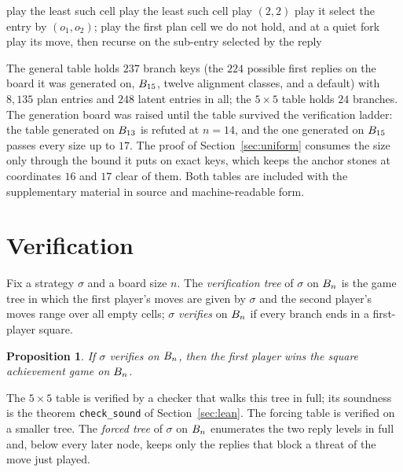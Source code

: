 \documentclass[11pt]{amsart}
\newtheorem{proposition}[theorem]{Proposition}
\theoremstyle{definition}
\theoremstyle{remark}
\begin{document}
\begin{algorithm}[ht]
\caption{The move function.}\label{alg:move}
\begin{algorithmic}[1]
  \State play the least such cell
  \State play the least such cell
  \State play $(2,2)$
  \State play it
\Else
  \State select the entry by $(o_1, o_2)$; play the first plan cell
    we do not hold, and at a quiet fork play its move, then recurse
    on the sub-entry selected by the reply
\EndIf
\end{algorithmic}
\end{algorithm}

The general table holds $237$ branch keys (the $224$ possible first
replies on the board it was generated on, $B_{15}$, twelve
alignment classes, and a default) with $8{,}135$ plan entries and
$248$ latent entries in all; the $5 \times 5$ table holds $24$
branches. The generation board was raised until the table survived
the verification ladder: the table generated on $B_{13}$ is
refuted at $n = 14$, and the one generated on $B_{15}$ passes
every size up to $17$. The proof of Section~\ref{sec:uniform}
consumes the size only through the bound it puts on exact keys, which
keeps the anchor stones at coordinates $16$ and $17$ clear of them.
Both tables are included with the supplementary material in source
and machine-readable form.

\section{Verification}\label{sec:verify}

Fix a strategy $\sigma$ and a board size $n$. The
\emph{verification tree} of $\sigma$ on $B_n$ is the game tree
in which the first player's moves are given by $\sigma$ and the
second player's moves range over all empty cells; $\sigma$
\emph{verifies} on $B_n$ if every branch ends in a first-player
square.

\begin{proposition}\label{prop:verify}
If $\sigma$ verifies on $B_n$, then the first player wins the
square achievement game on $B_n$.
\end{proposition}

The $5 \times 5$ table is verified by a checker that walks this
tree in full; its soundness is the theorem \texttt{check\_sound} of
Section~\ref{sec:lean}. The forcing table is verified on a smaller
tree. The \emph{forced tree} of $\sigma$ on $B_n$ enumerates
the two reply levels in full and, below every later node, keeps only
the replies that block a threat of the move just played.
\end{document}
